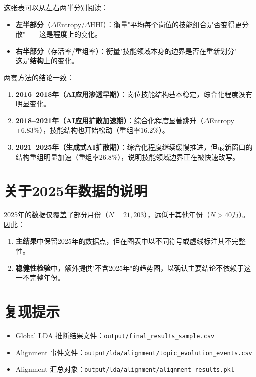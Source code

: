 \documentclass[12pt, a4paper, fontset=none]{ctexart}
\begin{document}
\noindent 这张表可以从左右两半分别阅读：
\begin{itemize}
    \item \textbf{左半部分}（$\Delta$Entropy/$\Delta$HHI）：衡量"平均每个岗位的技能组合是否变得更分散"——这是\textbf{程度}上的变化。
    \item \textbf{右半部分}（存活率/重组率）：衡量"技能领域本身的边界是否在重新划分"——这是\textbf{结构}上的变化。
\end{itemize}

两套方法的结论一致：
\begin{enumerate}
    \item \textbf{2016--2018年（AI应用渗透早期）}：岗位技能结构基本稳定，综合化程度没有明显变化。
    \item \textbf{2018--2021年（AI应用扩散加速期）}：综合化程度显著跳升（$\Delta$Entropy +6.83\%），技能结构也开始松动（重组率16.2\%）。
    \item \textbf{2021--2025年（生成式AI扩散期）}：综合化程度继续缓慢推进，但最新窗口的结构重组明显加速（重组率26.8\%），说明技能领域边界正在被快速改写。
\end{enumerate}

\section{关于2025年数据的说明}

2025年的数据仅覆盖了部分月份（$N = 21{,}203$），远低于其他年份（$N > 40$万）。因此：

\begin{enumerate}
    \item \textbf{主结果}中保留2025年的数据点，但在图表中以不同符号或虚线标注其不完整性。
    \item \textbf{稳健性检验}中，额外提供"不含2025年"的趋势图，以确认主要结论不依赖于这一不完整年份。
\end{enumerate}

\section{复现提示}

\begin{itemize}
    \item Global LDA 推断结果文件：\texttt{output/final\_results\_sample.csv}
    \item Alignment 事件文件：\texttt{output/lda/alignment/topic\_evolution\_events.csv}
    \item Alignment 汇总对象：\texttt{output/lda/alignment/alignment\_results.pkl}
\end{itemize}
\end{document}
